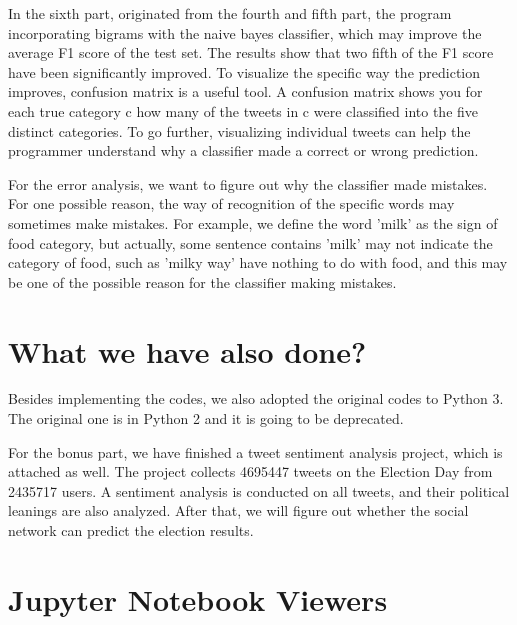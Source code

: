 \documentclass[12pt,a4paper]{report}
\begin{document}
  In the sixth part, originated from the fourth and fifth part, the
  program incorporating bigrams with the naive bayes classifier, which may
  improve the average F1 score of the test set. The results show that two
  fifth of the F1 score have been significantly improved. To visualize the
  specific way the prediction improves, confusion matrix is a useful tool.
  A confusion matrix shows you for each true category c how many of the
  tweets in c were classified into the five distinct categories. To go
  further, visualizing individual tweets can help the programmer
  understand why a classifier made a correct or wrong prediction.

  For the error analysis, we want to figure out why the classifier made
  mistakes. For one possible reason, the way of recognition of the
  specific words may sometimes make mistakes. For example, we define the
  word 'milk' as the sign of food category, but actually, some sentence
  contains 'milk' may not indicate the category of food, such as 'milky
  way' have nothing to do with food, and this may be one of the possible
  reason for the classifier making mistakes.

\section{What we have also done?}\label{header-n27}

  Besides implementing the codes, we also adopted the original codes to
  Python 3. The original one is in Python 2 and it is going to be
  deprecated.

  For the bonus part, we have finished a tweet sentiment analysis project,
  which is attached as well. The project collects 4695447 tweets on the
  Election Day from 2435717 users. A sentiment analysis is conducted on
  all tweets, and their political leanings are also analyzed. After that,
  we will figure out whether the social network can predict the election
  results.

\section{Jupyter Notebook Viewers}\label{header-n34}
\end{document}
